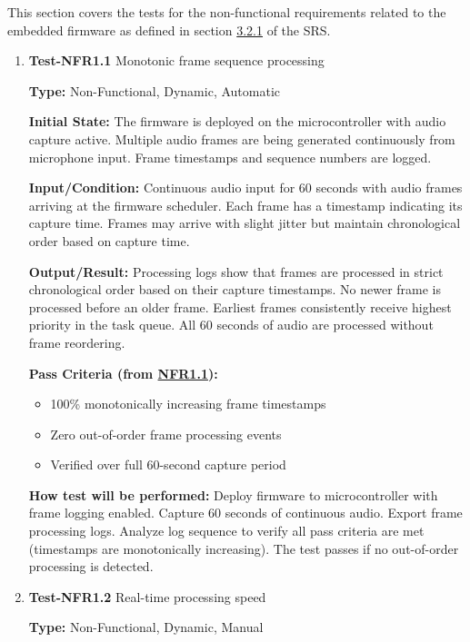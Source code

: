 \documentclass[12pt, titlepage]{article}
\begin{document}
This section covers the tests for the non-functional requirements related to the
embedded firmware as defined in section \hyperref[SRS-sec:FR1]{3.2.1} of the
SRS.

\begin{enumerate}

\item{\textbf{Test-NFR1.1} Monotonic frame sequence processing\\}

\textbf{Type:} Non-Functional, Dynamic, Automatic
					
\textbf{Initial State:} 
The firmware is deployed on the microcontroller with audio capture active.
Multiple audio frames are being generated continuously from microphone input.
Frame timestamps and sequence numbers are logged.
					
\textbf{Input/Condition:} 
Continuous audio input for 60 seconds with audio frames arriving at the firmware
scheduler. Each frame has a timestamp indicating its capture time. Frames may
arrive with slight jitter but maintain chronological order based on capture
time.
					
\textbf{Output/Result:} 
Processing logs show that frames are processed in strict chronological order
based on their capture timestamps. No newer frame is processed before an older
frame. Earliest frames consistently receive highest priority in the task queue.
All 60 seconds of audio are processed without frame reordering.

\textbf{Pass Criteria (from \hyperref[SRS-NFR1_1]{NFR1.1}):}
\begin{itemize}
\item 100\% monotonically increasing frame timestamps
\item Zero out-of-order frame processing events
\item Verified over full 60-second capture period
\end{itemize}
					
\textbf{How test will be performed:} 
Deploy firmware to microcontroller with frame logging enabled. Capture 60
seconds of continuous audio. Export frame processing logs. Analyze log sequence
to verify all pass criteria are met (timestamps are monotonically increasing).
The test passes if no out-of-order processing is detected.
					
\item{\textbf{Test-NFR1.2} Real-time processing speed\\}

\textbf{Type:} Non-Functional, Dynamic, Manual
					

\end{enumerate}
\end{document}
